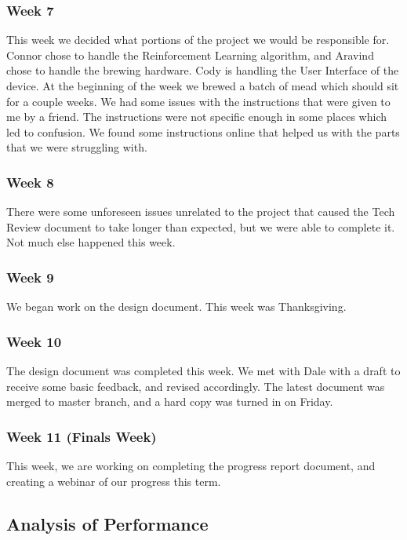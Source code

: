 \documentclass[draftclsnofoot,onecolumn,letterpaper,10pt]{IEEEtran}
\begin{document}
\subsubsection{Week 7}
This week we decided what portions of the project we would be responsible for.
Connor chose to handle the Reinforcement Learning algorithm, and Aravind chose to handle the brewing hardware.
Cody is handling the User Interface of the device.
At the beginning of the week we brewed a batch of mead which should sit for a couple weeks.
We had some issues with the instructions that were given to me by a friend.
The instructions were not specific enough in some places which led to confusion.
We found some instructions online that helped us with the parts that we were struggling with.

\subsubsection{Week 8}
There were some unforeseen issues unrelated to the project that caused the Tech Review document to take longer than expected, but we were able to complete it.
Not much else happened this week.

\subsubsection{Week 9} %
We began work on the design document. This week was Thanksgiving.

\subsubsection{Week 10} %
The design document was completed this week. We met with Dale with a draft to receive some basic feedback, and revised accordingly.
The latest document was merged to master branch, and a hard copy was turned in on Friday.

\subsubsection{Week 11 (Finals Week)} %
This week, we are working on completing the progress report document, and creating a webinar of our progress this term.

\subsection{Analysis of Performance}\label{sec:analysis}
\end{document}
